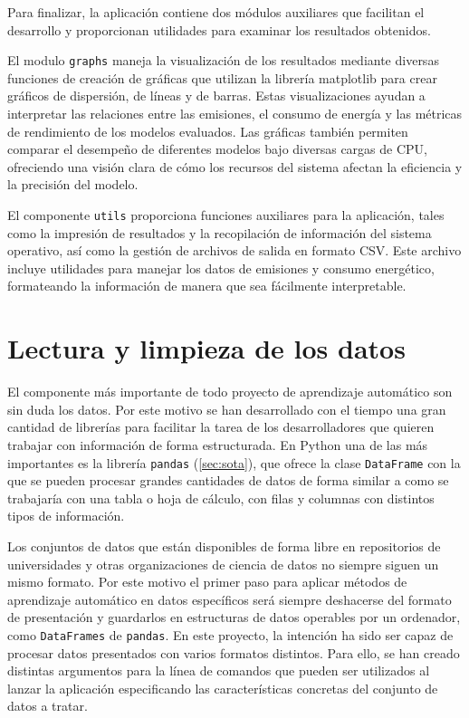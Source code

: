 Para finalizar, la aplicación contiene dos módulos auxiliares que facilitan el desarrollo y proporcionan utilidades para examinar los resultados obtenidos.

El modulo \texttt{graphs} maneja la visualización de los resultados mediante diversas funciones de creación de gráficas que utilizan la librería matplotlib para crear gráficos de dispersión, de líneas y de barras. Estas visualizaciones ayudan a interpretar las relaciones entre las emisiones, el consumo de energía y las métricas de rendimiento de los modelos evaluados. Las gráficas también permiten comparar el desempeño de diferentes modelos bajo diversas cargas de CPU, ofreciendo una visión clara de cómo los recursos del sistema afectan la eficiencia y la precisión del modelo.

El componente \texttt{utils} proporciona funciones auxiliares para la aplicación, tales como la impresión de resultados y la recopilación de información del sistema operativo, así como la gestión de archivos de salida en formato CSV. Este archivo incluye utilidades para manejar los datos de emisiones y consumo energético, formateando la información de manera que sea fácilmente interpretable. 


\section{Lectura y limpieza de los datos}
\label{sec:limpieza}

El componente más importante de todo proyecto de aprendizaje automático son sin duda los datos. Por este motivo se han desarrollado con el tiempo una gran cantidad de librerías para facilitar la tarea de los desarrolladores que quieren trabajar con información de forma estructurada. En Python una de las más importantes es la librería \texttt{pandas} (\ref{sec:sota}), que ofrece la clase \texttt{DataFrame} con la que se pueden procesar grandes cantidades de datos de forma similar a como se trabajaría con una tabla o hoja de cálculo, con filas y columnas con distintos tipos de información.

Los conjuntos de datos que están disponibles de forma libre en repositorios de universidades y otras organizaciones de ciencia de datos no siempre siguen un mismo formato. Por este motivo el primer paso para aplicar métodos de aprendizaje automático en datos específicos será siempre deshacerse del formato de presentación y guardarlos en estructuras de datos operables por un ordenador, como \texttt{DataFrames} de \texttt{pandas}. En este proyecto, la intención ha sido ser capaz de procesar datos presentados con varios formatos distintos. Para ello, se han creado distintas argumentos para la línea de comandos que pueden ser utilizados al lanzar la aplicación especificando las características concretas del conjunto de datos a tratar.

